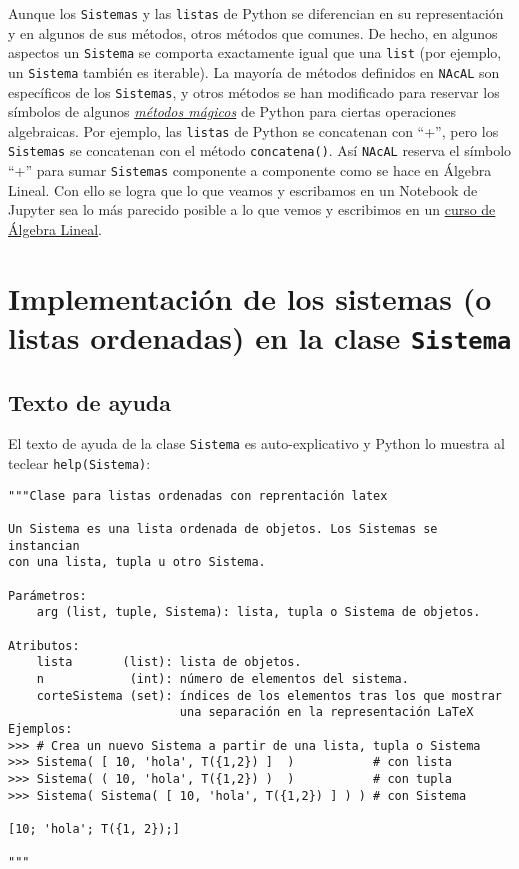 \documentclass[11pt]{report}
\begin{document}
Aunque los \texttt{Sistemas} y las \texttt{listas} de Python se diferencian en su representación y en algunos de
sus métodos, otros métodos que comunes. De hecho, en algunos aspectos un \texttt{Sistema} se comporta
exactamente igual que una \texttt{list} (por ejemplo, un \texttt{Sistema} también es iterable). La mayoría de
métodos definidos en \texttt{NAcAL} son específicos de los \texttt{Sistemas}, y otros métodos se han modificado
para reservar los símbolos de algunos \href{https://docs.python.org/3/reference/datamodel.html\#specialnames}{\emph{métodos mágicos}} de Python para ciertas operaciones
algebraicas. Por ejemplo, las \texttt{listas} de Python se concatenan con ``+'', pero los \texttt{Sistemas} se
concatenan con el método \texttt{concatena()}. Así \texttt{NAcAL} reserva el símbolo ``+'' para sumar \texttt{Sistemas}
componente a componente como se hace en Álgebra Lineal. Con ello se logra que lo que veamos y
escribamos en un Notebook de Jupyter sea lo más parecido posible a lo que vemos y escribimos en un
\href{https://mbujosab.github.io/CursoDeAlgebraLineal/libro.pdf\#chapter.1}{curso de Álgebra Lineal}.

\newpage

\section{Implementación de los sistemas (o listas ordenadas) en la clase \texttt{Sistema}}
\label{sec:org3365426}

\subsection{Texto de ayuda}
\label{sec:org7719eda}

El texto de ayuda de la clase \texttt{Sistema} es auto-explicativo y Python
lo muestra al teclear \texttt{help(Sistema)}:

\begin{verbatim}
"""Clase para listas ordenadas con reprentación latex

Un Sistema es una lista ordenada de objetos. Los Sistemas se instancian
con una lista, tupla u otro Sistema. 

Parámetros:
    arg (list, tuple, Sistema): lista, tupla o Sistema de objetos.

Atributos:
    lista       (list): lista de objetos.
    n            (int): número de elementos del sistema.
    corteSistema (set): índices de los elementos tras los que mostrar
                        una separación en la representación LaTeX
Ejemplos:
>>> # Crea un nuevo Sistema a partir de una lista, tupla o Sistema
>>> Sistema( [ 10, 'hola', T({1,2}) ]  )           # con lista
>>> Sistema( ( 10, 'hola', T({1,2}) )  )           # con tupla
>>> Sistema( Sistema( [ 10, 'hola', T({1,2}) ] ) ) # con Sistema

[10; 'hola'; T({1, 2});]

"""
\end{verbatim}
\end{document}
